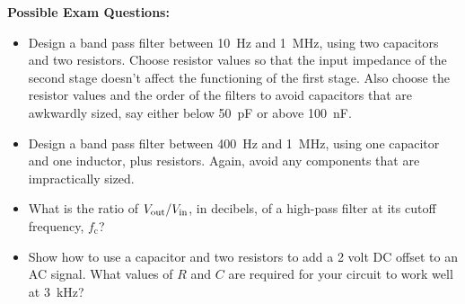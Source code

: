 \pagebreak[3]
\textbf{Possible Exam Questions:}

\begin{itemize}

\item Design a band pass filter between 10~Hz and 1~MHz, using two capacitors and two resistors.  Choose resistor values so that the input impedance of the second stage doesn't affect the functioning of the first stage.  Also choose the resistor values and the order of the filters to avoid capacitors that are awkwardly sized, say either below 50~pF or above 100~nF.

\item Design a band pass filter between 400~Hz and 1~MHz, using one capacitor and one inductor, plus resistors.  Again, avoid any components that are impractically sized.

\item What is the ratio of $V_{\rm out}/V_{\rm in}$, in decibels, of a high-pass filter at its cutoff frequency, $f_\text{c}$?

\item Show how to use a capacitor and two resistors to add a 2 volt DC offset to an AC signal.  What values of $R$ and $C$ are required for your circuit to work well at 3~kHz?


\end{itemize}





